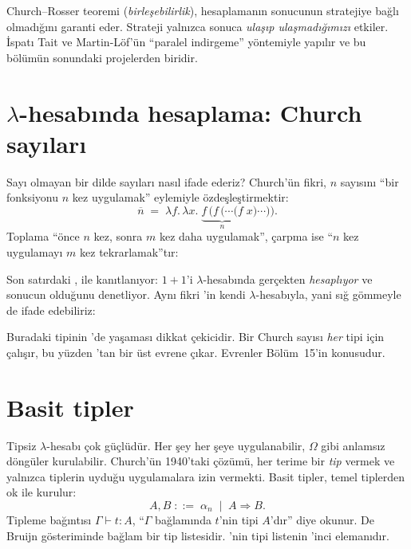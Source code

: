 \noindent Church--Rosser teoremi (\emph{birleşebilirlik}), hesaplamanın
sonucunun stratejiye bağlı olmadığını garanti eder. Strateji yalnızca
sonuca \emph{ulaşıp ulaşmadığımızı} etkiler. İspatı Tait ve Martin-Löf'ün
``paralel indirgeme'' yöntemiyle yapılır ve bu bölümün sonundaki
projelerden biridir.

\section{$λ$-hesabında hesaplama: Church sayıları}\label{sec:church}

Sayı olmayan bir dilde sayıları nasıl ifade ederiz? Church'ün fikri, $n$
sayısını ``bir fonksiyonu $n$ kez uygulamak'' eylemiyle özdeşleştirmektir:
\[
  \overline{n} \;=\; \lambda f.\,\lambda x.\; \underbrace{f\,(f\,(\cdots(f}_{n}\; x)\cdots)).
\]
Toplama ``önce $n$ kez, sonra $m$ kez daha uygulamak'', çarpma ise ``$n$
kez uygulamayı $m$ kez tekrarlamak''tır:


\noindent Son satırdaki ,  ile kanıtlanıyor:
\Lean{} $1 + 1$'i $\lambda$-hesabında gerçekten \emph{hesaplıyor} ve
sonucun  olduğunu denetliyor. Aynı fikri \Lean{}'in kendi
$\lambda$-hesabıyla, yani sığ gömmeyle de ifade edebiliriz:


\noindent Buradaki  tipinin 'de yaşaması
dikkat çekicidir. Bir Church sayısı \emph{her}  tipi için çalışır,
bu yüzden 'tan bir üst evrene çıkar. Evrenler Bölüm~15'in
konusudur.

\section{Basit tipler}\label{sec:basit-tipler}

Tipsiz $\lambda$-hesabı çok güçlüdür. Her şey her şeye uygulanabilir, $\Omega$
gibi anlamsız döngüler kurulabilir. Church'ün 1940'taki çözümü, her
terime bir \emph{tip} vermek ve yalnızca tiplerin uyduğu uygulamalara
izin vermekti. Basit tipler, temel tiplerden ok ile kurulur:
\[
  A, B \;::=\; \alpha_n \;\mid\; A \Rightarrow B .
\]
Tipleme bağıntısı $\Gamma \vdash t : A$, ``$\Gamma$ bağlamında $t$'nin tipi
$A$'dır'' diye okunur. De Bruijn gösteriminde bağlam bir tip
listesidir. 'nin tipi listenin 'inci elemanıdır.

